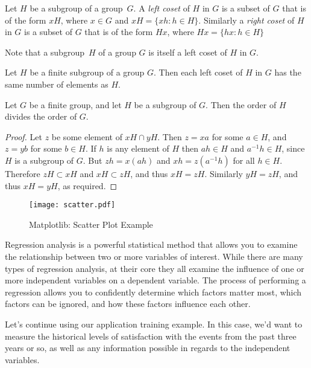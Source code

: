 \documentclass[en,hazy,blue,screen,14pt]{elegantnote}
\begin{document}

\begin{definition}
Let $H$ be a subgroup of a group~$G$.  A \emph{left coset} of $H$ in $G$ is a subset of $G$ that is of the form $xH$, where $x \in G$ and $xH = \{ xh : h \in H \}$. Similarly a \emph{right coset} of $H$ in $G$ is a subset of $G$ that is of the form $Hx$, where $Hx = \{ hx : h \in H \}$
\end{definition}

Note that a subgroup~$H$ of a group $G$ is itself a left coset of $H$ in $G$.

\begin{lemma}
Let $H$ be a finite subgroup of a group $G$.  Then each left
coset of $H$ in $G$ has the same number of elements as $H$.
\end{lemma}

\begin{theorem}
Let $G$ be a finite group, and let $H$ be a subgroup
of $G$.  Then the order of $H$ divides the order of $G$.
\end{theorem}

\begin{proof}
Let $z$ be some element of $xH \cap yH$.  Then $z = xa$ for some $a \in H$, and $z = yb$ for some $b \in H$. If $h$ is any element of $H$ then $ah \in H$ and $a^{-1}h \in H$, since $H$ is a subgroup of $G$. But $zh = x(ah)$ and $xh = z(a^{-1}h)$ for all $h \in H$. Therefore $zH \subset xH$ and $xH \subset zH$, and thus $xH = zH$.  Similarly $yH = zH$, and thus $xH = yH$, as required.
\end{proof}

\begin{figure}[!htbp]
	\centering
	\texttt{[image: scatter.pdf]}
	\caption{Matplotlib: Scatter Plot Example\label{fig:mpg}}
\end{figure}

Regression analysis is a powerful statistical method that allows you to examine the relationship between two or more variables of interest. While there are many types of regression analysis, at their core they all examine the influence of one or more independent variables on a dependent variable. The process of performing a regression allows you to confidently determine which factors matter most, which factors can be ignored, and how these factors influence each other.

Let's continue using our application training example. In this case, we'd want to measure the historical levels of satisfaction with the events from the past three years or so, as well as any information possible in regards to the independent variables. 
\end{document}
